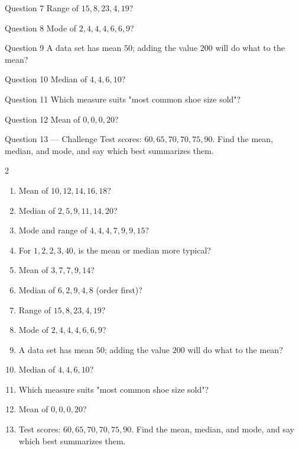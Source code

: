 \documentclass[11pt]{article}
\begin{document}
\begin{qbox}{Question 7}
Range of $15,8,23,4,19$?\workspace{2.4cm}
\end{qbox}

\begin{qbox}{Question 8}
Mode of $2,4,4,4,6,6,9$?\workspace{2.4cm}
\end{qbox}

\begin{qbox}{Question 9}
A data set has mean $50$; adding the value $200$ will do what to the mean?\workspace{2.4cm}
\end{qbox}

\begin{qbox}{Question 10}
Median of $4,4,6,10$?\workspace{2.4cm}
\end{qbox}

\begin{qbox}{Question 11}
Which measure suits "most common shoe size sold"?\workspace{2.4cm}
\end{qbox}

\begin{qbox}{Question 12}
Mean of $0,0,0,20$?\workspace{2.4cm}
\end{qbox}

\begin{qbox}{Question 13 --- Challenge}
Test scores: $60,65,70,70,75,90$. Find the mean, median, and mode, and say which best summarizes them.\workspace{3cm}
\end{qbox}

\clearpage
{}

\begin{recapbox}
\begin{multicols}{2}
\small
\begin{enumerate}[leftmargin=*,itemsep=3pt]
  \item Mean of $10,12,14,16,18$?
  \item Median of $2,5,9,11,14,20$?
  \item Mode and range of $4,4,4,7,9,9,15$?
  \item For $1,2,2,3,40$, is the mean or median more typical?
  \item Mean of $3,7,7,9,14$?
  \item Median of $6,2,9,4,8$ (order first)?
  \item Range of $15,8,23,4,19$?
  \item Mode of $2,4,4,4,6,6,9$?
  \item A data set has mean $50$; adding the value $200$ will do what to the mean?
  \item Median of $4,4,6,10$?
  \item Which measure suits "most common shoe size sold"?
  \item Mean of $0,0,0,20$?
  \item Test scores: $60,65,70,70,75,90$. Find the mean, median, and mode, and say which best summarizes them.
\end{enumerate}
\end{multicols}
\end{recapbox}
\end{document}
